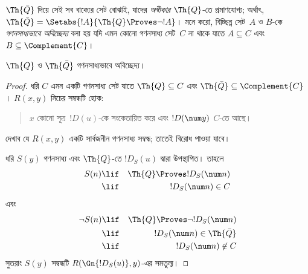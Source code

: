 \documentclass[../../../include/open-logic-section]{subfiles}
\begin{document}



$\Th{\bar Q}$ দিয়ে সেই সব বাক্যের সেট বোঝাই, যাদের \emph{অস্বীকার}
$\Th{Q}$-তে প্রমাণযোগ্য; অর্থাৎ,
$\Th{\bar Q} = \Setabs{!A}{\Th{Q} \Proves \lnot !A}$। মনে করো,
বিচ্ছিন্ন সেট~$A$ ও $B$-কে \emph{গণনসাধ্যভাবে অবিচ্ছেদ্য} বলা হয় যদি
এমন কোনো গণনসাধ্য সেট~$C$ না থাকে যাতে $A \subseteq C$ এবং
$B \subseteq \Complement{C}$।

\begin{lem}
$\Th{Q}$ ও $\Th{\bar Q}$ গণনসাধ্যভাবে অবিচ্ছেদ্য।
\end{lem}

\begin{proof}
ধরি $C$ এমন একটি গণনসাধ্য সেট যাতে $\Th{Q} \subseteq C$ এবং
$\Th{\bar Q} \subseteq \Complement{C}$। $R(x,y)$ নিচের সম্বন্ধটি হোক:
\begin{quote}
$x$ কোনো সূত্র~$!D(u)$-কে সংকেতায়িত করে এবং $!D(\num y)$ $C$-তে আছে।
\end{quote}
দেখাব যে $R(x,y)$ একটি সার্বজনীন গণনসাধ্য সম্বন্ধ; তাতেই বিরোধ পাওয়া
যাবে।

ধরি $S(y)$ গণনসাধ্য এবং $\Th{Q}$-তে $!D_S(u)$ দ্বারা উপস্থাপিত। তাহলে
\begin{eqnarray*}
S(n) & \lif & \Th{Q} \Proves !D_S(\num n) \\
& \lif & !D_S(\num n) \in C
\end{eqnarray*}
এবং
\begin{eqnarray*}
\lnot S(n) & \lif & \Th{Q} \Proves \lnot !D_S(\num n) \\
& \lif & !D_S(\num n) \in \Th{\bar Q} \\
& \lif & !D_S(\num n) \not\in C
\end{eqnarray*}
সুতরাং $S(y)$ সম্বন্ধটি $R(\Gn{!D_S(u)},y)$-এর সমতুল্য।
\end{proof}
\end{document}
